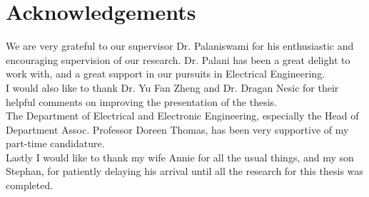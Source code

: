 \chapter*{Acknowledgements}


We are very  grateful  to our supervisor Dr. Palaniswami for  his
enthusiastic  and  encouraging   supervision of our  research. Dr. Palani  has  been a  
great   delight to  work  with, and  a great  support  in our pursuits in  Electrical Engineering. \\

I  would  also  like to thank Dr. Yu Fan Zheng and Dr. Dragan  Nesic for their helpful comments  on improving the presentation of the  thesis. \\

The Department of Electrical  and  Electronic Engineering, especially the  Head of Department 
Assoc. Professor Doreen Thomas,  has  been very supportive  of my part-time  candidature. \\

Lastly I  would like to thank  my  wife  Annie  for  all  the  usual  things, and my  son Stephan,  for  patiently   delaying his  arrival  until  all the  research   for this thesis  was  completed. \\